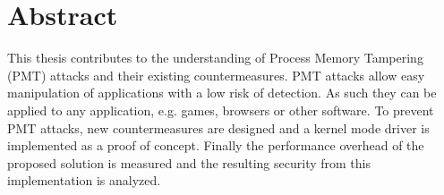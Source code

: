 \newpage
\thispagestyle{empty}
\section*{Abstract}
This thesis contributes to the understanding of Process Memory Tampering (PMT) attacks and their existing countermeasures. PMT attacks allow easy manipulation of applications with a low risk of detection. As such they can be applied to any application, e.g. games, browsers or other software. To prevent PMT attacks, new countermeasures are designed and a kernel mode driver is implemented as a proof of concept. Finally the performance overhead of the proposed solution is measured and the resulting security from this implementation is analyzed.